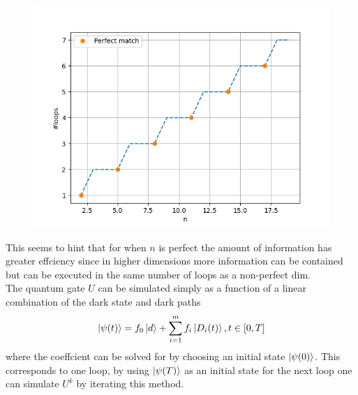 \begin{figure}[H]
\centering
\includegraphics[scale=0.6]{figures/perfect_dim.png}
\end{figure}

This seems to hint that for when $n$ is perfect the amount of information has greater effciency since in higher dimensions more information can be contained but can be executed in the same number of loops as a non-perfect dim. 
\\ 
The quantum gate $U$ can be simulated simply as a function of a linear combination of the dark state and dark paths
\begin{equation}
\ket{\psi(t)} = f_0\ket{d} + \sum_{i = 1}^{m}f_i\ket{D_i(t)}, t \in [0,T]
\end{equation}
where the coeffcient can be solved for by choosing an initial state $\ket{\psi(0)}$. This corresponds to one loop, by using $\ket{\psi(T)}$ as an initial state for the next loop one can simulate $U^k$ by iterating this method.





